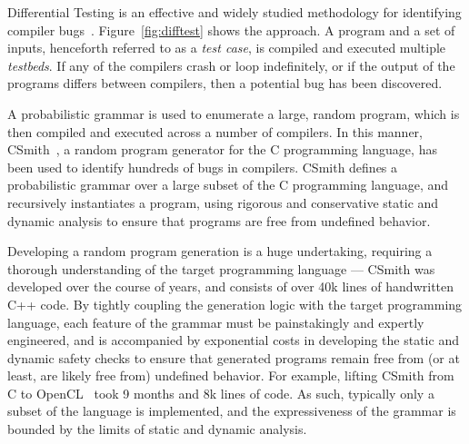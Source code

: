 Differential Testing is an effective and widely studied methodology for identifying compiler bugs~\cite{Chen2014a,Kossatchev2005,Chen2013}. Figure~\ref{fig:difftest} shows the approach. A program and a set of inputs, henceforth referred to as a \emph{test case}, is compiled and executed multiple \emph{testbeds}. If any of the compilers crash or loop indefinitely, or if the output of the programs differs between compilers, then a potential bug has been discovered. 

A probabilistic grammar is used to enumerate a large, random program, which is then compiled and executed across a number of compilers. In this manner, CSmith~\cite{Yang2011}, a random program generator for the C programming language, has been used to identify hundreds of bugs in compilers. CSmith defines a probabilistic grammar over a large subset of the C programming language, and recursively instantiates a program, using rigorous and conservative static and dynamic analysis to ensure that programs are free from undefined behavior.

Developing a random program generation is a huge undertaking, requiring a thorough understanding of the target programming language --- CSmith was developed over the course of years, and consists of over 40k lines of handwritten C++ code. By tightly coupling the generation logic with the target programming language, each feature of the grammar must be painstakingly and expertly engineered, and is accompanied by exponential costs in developing the static and dynamic safety checks to ensure that generated programs remain free from (or at least, are likely free from) undefined behavior. For example, lifting CSmith from C to OpenCL~\cite{Lidbury2015a} took 9 months and 8k lines of code. As such, typically only a subset of the language is implemented, and the expressiveness of the grammar is bounded by the limits of static and dynamic analysis. 

